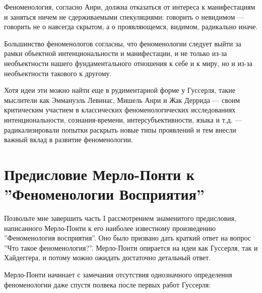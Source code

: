 \documentclass[11pt]{book}
\begin{document}
\relax
{}\relax
\smallskip

Феноменология, согласно Анри, должна отказаться от интереса к манифестациям и заняться ничем не сдерживаемыми спекуляциями: говорить о невидимом --- говорить не о навсегда скрытом, а о проявляющемся, видимом, радикально иначе.

Большинство феноменологов согласны, что феноменологии следует выйти за рамки объектной интенциональности и манифестации, и не только из-за необъектности нашего фундаментального отношения к себе и к миру, но и из-за необъектности такового к другому.

Хотя идеи эти можно найти еще в рудиментарной форме у Гуссерля, такие мыслители как Эммануэль Левинас, Мишель Анри и Жак Деррида --- своим критическим участием в классических феноменологических исследованиях интенциональности, сознания-времени, интерсубъективности, языка и т.д. --- радикализировали попытки раскрыть новые типы проявлений и тем внесли важный вклад в развитие феноменологии.

\chapter{Предисловие Мерло-Понти к ''Феноменологии Восприятия''}

Позвольте мне завершить часть I рассмотрением знаменитого предисловия, написанного Мерло-Понти к его наиболее известному произведению ''Феноменология восприятия''. Оно было призвано дать краткий ответ на вопрос ''Что такое феноменология?''. Мерло-Понти опирается на идеи как Гуссерля, так и Хайдеггера, и потому можно ожидать достаточно детальный ответ.

Мерло-Понти начинает с замечания отсутствия однозначного определения феноменологии даже спустя полвека после первых работ Гуссерля:
\end{document}

